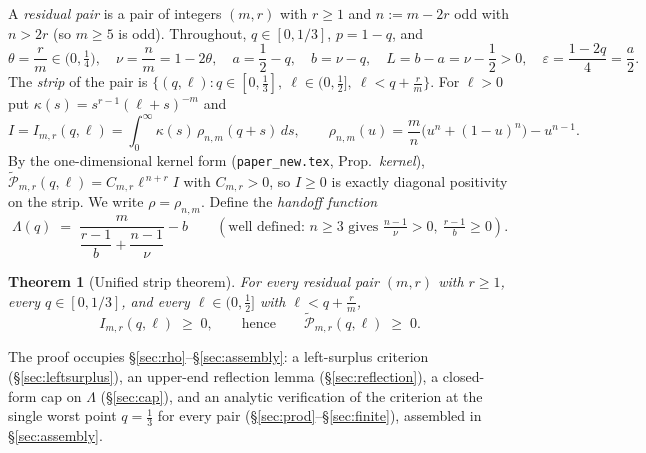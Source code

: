 \documentclass[11pt]{article}
\newtheorem{theorem}{Theorem}[section]
\theoremstyle{remark}
\theoremstyle{plain}
\theoremstyle{plain}
\newcommand{\wtP}{\widetilde{\mathcal P}}
\begin{document}
A \emph{residual pair} is a pair of integers $(m,r)$ with $r\ge1$ and $n:=m-2r$ odd with $n>2r$ (so $m\ge5$ is odd).  Throughout, $q\in[0,1/3]$, $p=1-q$, and
\[
        \theta=\frac rm\in\bigl(0,\tfrac14\bigr),\quad
        \nu=\frac nm=1-2\theta,\quad
        a=\frac12-q,\quad
        b=\nu-q,\quad
        L=b-a=\nu-\frac12>0,\quad
        \varepsilon=\frac{1-2q}{4}=\frac a2 .
\]
The \emph{strip} of the pair is $\{(q,\ell):q\in[0,\tfrac13],\ \ell\in(0,\tfrac12],\ \ell<q+\tfrac rm\}$.  For $\ell>0$ put $\kappa(s)=s^{r-1}(\ell+s)^{-m}$ and
\[
        I=I_{m,r}(q,\ell)
        =\int_0^\infty \kappa(s)\,\rho_{n,m}(q+s)\,ds,
        \qquad
        \rho_{n,m}(u)=\frac mn\bigl(u^n+(1-u)^n\bigr)-u^{n-1}.
\]
By the one-dimensional kernel form (\texttt{paper\_new.tex}, Prop.~\emph{kernel}), $\wtP_{m,r}(q,\ell)=C_{m,r}\ell^{\,n+r}I$ with $C_{m,r}>0$, so $I\ge0$ is exactly diagonal positivity on the strip.  We write $\rho=\rho_{n,m}$.  Define the \emph{handoff function}
\begin{equation}\label{eq:Lambda}
        \Lambda(q)\;=\;\frac{m}{\dfrac{r-1}{b}+\dfrac{n-1}{\nu}}-b
        \qquad(\text{well defined: }n\ge3\text{ gives }\tfrac{n-1}\nu>0,\ \tfrac{r-1}b\ge0).
\end{equation}

\begin{theorem}[Unified strip theorem]\label{thm:strip-main}
For every residual pair $(m,r)$ with $r\ge1$, every $q\in[0,1/3]$, and every $\ell\in(0,\tfrac12]$ with $\ell<q+\tfrac rm$,
\[
        I_{m,r}(q,\ell)\;\ge\;0,
        \qquad\text{hence}\qquad
        \wtP_{m,r}(q,\ell)\;\ge\;0 .
\]
\end{theorem}

The proof occupies \S\ref{sec:rho}--\S\ref{sec:assembly}: a left-surplus criterion (\S\ref{sec:leftsurplus}), an upper-end reflection lemma (\S\ref{sec:reflection}), a closed-form cap on $\Lambda$ (\S\ref{sec:cap}), and an analytic verification of the criterion at the single worst point $q=\tfrac13$ for every pair (\S\ref{sec:prod}--\S\ref{sec:finite}), assembled in \S\ref{sec:assembly}.
\end{document}
